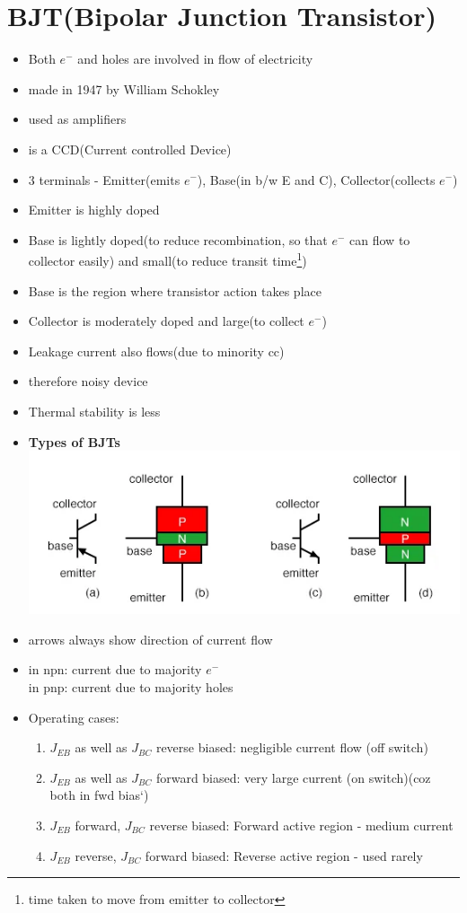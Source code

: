 \documentclass[10pt, a4paper]{report}
\begin{document}
	\section{BJT(Bipolar Junction Transistor)}
		\begin{itemize}
			\item Both $ e^- $ and holes are involved in flow of electricity
			\item made in 1947 by William Schokley
			\item used as amplifiers
			\item is a CCD(Current controlled Device)
			\item 3 terminals - Emitter(emits $ e^- $), Base(in b/w E and C), Collector(collects $ e^- $)
			\item Emitter is highly doped
			\item Base is lightly doped(to reduce recombination, so that $ e^- $ can flow to collector easily) and small(to reduce transit time\footnote{time taken to move from emitter to collector})
			\item Base is the region where transistor action takes place
			\item Collector is moderately doped and large(to collect $ e^- $)
			\item Leakage current also flows(due to minority cc)
			\item therefore noisy device
			\item Thermal stability is less
			\item \textbf{Types of BJTs} \\
				\includegraphics[width=0.9\linewidth]{img/bjt types}
			\item arrows always show direction of current flow
			\item in npn: current due to majority $ e^- $ \\in pnp: current due to majority holes
			\item Operating cases: \\
				\begin{enumerate}
					\item $ J_{EB} $ as well as $ J_{BC} $ reverse biased: negligible current flow (off switch)
					\item $ J_{EB} $ as well as $ J_{BC} $ forward biased: very large current (on switch)(coz both in fwd bias`)
					\item $ J_{EB} $ forward, $ J_{BC} $ reverse biased: Forward active region - medium current
					\item $ J_{EB} $ reverse, $ J_{BC} $ forward biased: Reverse active region - used rarely
				\end{enumerate}
		\end{itemize}
\end{document}
